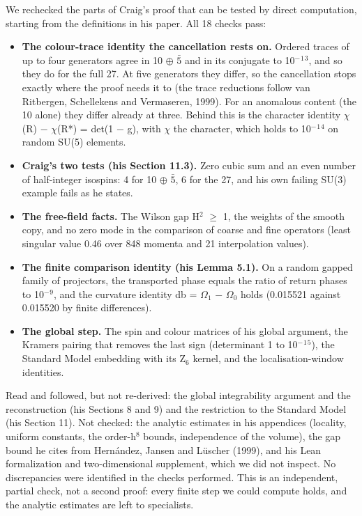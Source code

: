 \documentclass[
]{article}
\providecommand{\tightlist}{%
  \setlength{\itemsep}{0pt}\setlength{\parskip}{0pt}}
\begin{document}
We rechecked the parts of Craig's proof that can be tested by direct
computation, starting from the definitions in his paper. All 18 checks
pass:

\begin{itemize}
\tightlist
\item
  \textbf{The colour-trace identity the cancellation rests on.} Ordered
  traces of up to four generators agree in 10 \ensuremath{\oplus} \ensuremath{\bar{5}} and in its conjugate
  to 10\ensuremath{^{-}}\ensuremath{^{1}}\ensuremath{^{3}}, and so they do for the full 27. At five generators they
  differ, so the cancellation stops exactly where the proof needs it to
  (the trace reductions follow van Ritbergen, Schellekens and
  Vermaseren, 1999). For an anomalous content (the 10 alone) they differ
  already at three. Behind this is the character identity \ensuremath{\chi}(R) \ensuremath{-} \ensuremath{\chi}(R*) =
  det(1 \ensuremath{-} g), with \ensuremath{\chi} the character, which holds to 10\ensuremath{^{-}}\ensuremath{^{1}}\ensuremath{^{4}} on random SU(5)
  elements.
\item
  \textbf{Craig's two tests (his Section 11.3).} Zero cubic sum and an
  even number of half-integer isospins: 4 for 10 \ensuremath{\oplus} \ensuremath{\bar{5}}, 6 for the 27, and
  his own failing SU(3) example fails as he states.
\item
  \textbf{The free-field facts.} The Wilson gap H\ensuremath{^{2}} \ensuremath{\geq} 1, the weights of
  the smooth copy, and no zero mode in the comparison of coarse and fine
  operators (least singular value 0.46 over 848 momenta and 21
  interpolation values).
\item
  \textbf{The finite comparison identity (his Lemma 5.1).} On a random
  gapped family of projectors, the transported phase equals the ratio of
  return phases to 10\ensuremath{^{-}}\ensuremath{^{9}}, and the curvature identity db = \ensuremath{\Omega}\ensuremath{_{1}} \ensuremath{-} \ensuremath{\Omega}\ensuremath{_{0}} holds
  (0.015521 against 0.015520 by finite differences).
\item
  \textbf{The global step.} The spin and colour matrices of his global
  argument, the Kramers pairing that removes the last sign (determinant
  1 to 10\ensuremath{^{-}}\ensuremath{^{1}}\ensuremath{^{5}}), the Standard Model embedding with its Z\ensuremath{_{6}} kernel, and the
  localisation-window identities.
\end{itemize}

Read and followed, but not re-derived: the global integrability argument
and the reconstruction (his Sections 8 and 9) and the restriction to the
Standard Model (his Section 11). Not checked: the analytic estimates in
his appendices (locality, uniform constants, the order-h\ensuremath{^{8}} bounds,
independence of the volume), the gap bound he cites from Hernández,
Jansen and Lüscher (1999), and his Lean formalization and
two-dimensional supplement, which we did not inspect. No discrepancies
were identified in the checks performed. This is an independent, partial
check, not a second proof: every finite step we could compute holds, and
the analytic estimates are left to specialists.
\end{document}
